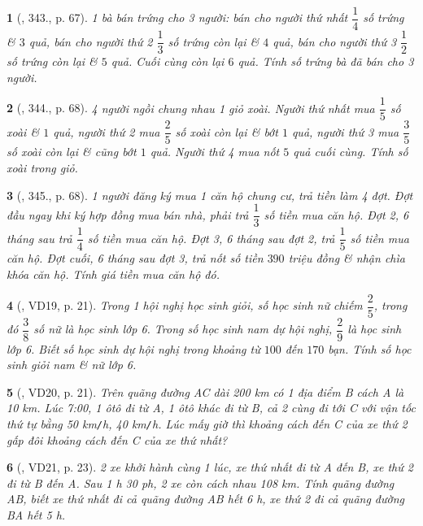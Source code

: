 \documentclass{article}
\newtheorem{baitoan}{}
\begin{document}
\begin{baitoan}[\cite{Tuyen_Toan_6}, 343., p. 67]
	1 bà bán trứng cho 3 người: bán cho người thứ nhất $\dfrac{1}{4}$ số trứng \& $3$ quả, bán cho người thứ 2 $\dfrac{1}{3}$ số trứng còn lại \& $4$ quả, bán cho người thứ 3 $\dfrac{1}{2}$ số trứng còn lại \& $5$ quả. Cuối cùng còn lại $6$ quả. Tính số trứng bà đã bán cho 3 người.
\end{baitoan}

\begin{baitoan}[\cite{Tuyen_Toan_6}, 344., p. 68]
	4 người ngồi chung nhau 1 giỏ xoài. Người thứ nhất mua $\dfrac{1}{5}$ số xoài \& $1$ quả, người thứ 2 mua $\dfrac{2}{5}$ số xoài còn lại \& bớt $1$ quả, người thứ 3 mua $\dfrac{3}{5}$ số xoài còn lại \& cũng bớt $1$ quả. Người thứ 4 mua nốt $5$ quả cuối cùng. Tính số xoài trong giỏ.
\end{baitoan}

\begin{baitoan}[\cite{Tuyen_Toan_6}, 345., p. 68]
	1 người đăng ký mua 1 căn hộ chung cư, trả tiền làm 4 đợt. Đợt đầu ngay khi ký hợp đồng mua bán nhà, phải trả $\dfrac{1}{3}$ số tiền mua căn hộ. Đợt 2, 6 tháng sau trả $\dfrac{1}{4}$ số tiền mua căn hộ. Đợt 3, 6 tháng sau đợt 2, trả $\dfrac{1}{5}$ số tiền mua căn hộ. Đợt cuối, 6 tháng sau đợt 3, trả nốt số tiền $390$ triệu đồng \& nhận chìa khóa căn hộ. Tính giá tiền mua căn hộ đó.
\end{baitoan}

\begin{baitoan}[\cite{Binh_Toan_6_tap_2}, VD19, p. 21]
	Trong 1 hội nghị học sinh giỏi, số học sinh nữ chiếm $\dfrac{2}{5}$, trong đó $\dfrac{3}{8}$ số nữ là học sinh lớp 6. Trong số học sinh nam dự hội nghị, $\dfrac{2}{9}$ là học sinh lớp 6. Biết số học sinh dự hội nghị trong khoảng từ $100$ đến $170$ bạn. Tính số học sinh giỏi nam \& nữ lớp 6.
\end{baitoan}

\begin{baitoan}[\cite{Binh_Toan_6_tap_2}, VD20, p. 21]
	Trên quãng đường AC dài {\rm200 km} có 1 địa điểm B cách A là {\rm10 km}. Lúc {\rm7:00}, 1 ôtô đi từ A, 1 ôtô khác đi từ B, cả 2 cùng đi tới C với vận tốc thứ tự bằng {\rm50 km{\tt/}h, 40 km{\tt/}h}. Lúc mấy giờ thì khoảng cách đến C của xe thứ 2 gấp đôi khoảng cách đến C của xe thứ nhất?
\end{baitoan}

\begin{baitoan}[\cite{Binh_Toan_6_tap_2}, VD21, p. 23]
	2 xe khởi hành cùng 1 lúc, xe thứ nhất đi từ A đến B, xe thứ 2 đi từ B đến A. Sau {\rm1 h 30 ph}, 2 xe còn cách nhau {\rm108 km}. Tính quãng đường AB, biết xe thứ nhất đi cả quãng đường AB hết {\rm6 h}, xe thứ 2 đi cả quãng đường BA hết {\rm5 h}.
\end{baitoan}
\end{document}
